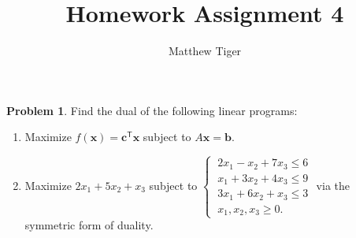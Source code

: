 \documentclass[12pt]{article}
\title{Homework Assignment 4}
\author{Matthew Tiger}
\theoremstyle{definition}
\newtheorem{problem}{Problem}
\newcommand{\vc}[1]{\boldsymbol{#1}}
\newcommand{\tran}{\mathsf{T}}
\begin{document}
\maketitle


\begin{problem}
  Find the dual of the following linear programs:
  \begin{enumerate}
    \item Maximize $f(\vc{x}) = \vc{c}^\tran \vc{x}$ subject to $A\vc{x}=\vc{b}$.
    \item Maximize $2x_1 + 5x_2 + x_3$ subject to $\begin{cases}
        \ 2x_1 - x_2 + 7x_3 \leq 6 \\
        \ x_1 + 3x_2 + 4x_3 \leq 9 \\
        \ 3x_1 + 6x_2 + x_3 \leq 3 \\
        \ x_1, x_2, x_3 \geq 0.
      \end{cases}$
      via the symmetric form of duality.
  \end{enumerate}
\end{problem}
\end{document}
